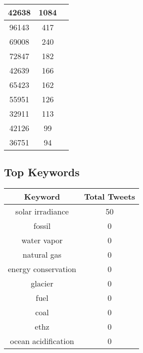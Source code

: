 \documentclass{article}\usepackage[T1]{fontenc}
\begin{document}
\begin{tabular}{|c|c|c|}
 \hline
42638 & 1084\\ 
 \hline
96143 & 417\\ 
 \hline
69008 & 240\\ 
 \hline
72847 & 182\\ 
 \hline
42639 & 166\\ 
 \hline
65423 & 162\\ 
 \hline
55951 & 126\\ 
 \hline
32911 & 113\\ 
 \hline
42126 & 99\\ 
 \hline
36751 & 94\\ 
 \hline
\end{tabular}\subsection*{Top Keywords}\begin{tabular}{|c|c|}         \hline         Keyword & Total Tweets \\ 
 \hline
solar irradiance & 50\\ 
 \hline
fossil & 0\\ 
 \hline
water vapor & 0\\ 
 \hline
natural gas & 0\\ 
 \hline
energy conservation & 0\\ 
 \hline
glacier & 0\\ 
 \hline
fuel & 0\\ 
 \hline
coal & 0\\ 
 \hline
ethz & 0\\ 
 \hline
ocean acidification & 0\\ 
 \hline
\end{tabular}
\end{document}

